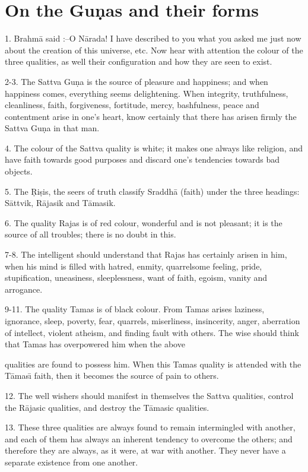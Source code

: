 \chapter{On the Gu\d{n}as and their forms}

1. Brahm\=a said :--O N\=arada! I have described to you what you asked me just now about the creation of this universe, etc. Now hear with attention the colour of the three qualities, as well their configuration and how they are seen to exist.

2-3. The Sattva Gu\d{n}a is the source of pleasure and happiness; and when happiness comes, everything seems delightening. When integrity, truthfulness, cleanliness, faith, forgiveness, fortitude, mercy, bashfulness, peace and contentment arise in one's heart, know certainly that there has arisen firmly the Sattva Gu\d{n}a in that man.

4. The colour of the Sattva quality is white; it makes one always like religion, and have faith towards good purposes and discard one's tendencies towards bad objects.

5. The \d{R}i\d{s}is, the seers of truth classify Sraddh\=a (faith) under the three headings: S\=attvik, R\=ajasik and T\=amasik.

6. The quality Rajas is of red colour, wonderful and is not pleasant; it is the source of all troubles; there is no doubt in this.

7-8. The intelligent should understand that Rajas has certainly arisen in him, when his mind is filled with hatred, enmity, quarrelsome feeling, pride, stupification, uneasiness, sleeplessness, want of faith, egoism, vanity and arrogance.

9-11. The quality Tamas is of black colour. From Tamas arises laziness, ignorance, sleep, poverty, fear, quarrels, miserliness, insincerity, anger, aberration of intellect, violent atheism, and finding fault with others. The wise should think that Tamas has overpowered him when the above

qualities are found to possess him. When this Tamas quality is attended with the T\=amas\={\i} faith, then it becomes the source of pain to others.

12. The well wishers should manifest in themselves the Sattva qualities, control the R\=ajasic qualities, and destroy the T\=amasic qualities.

13. These three qualities are always found to remain intermingled with another, and each of them has always an inherent tendency to overcome the others; and therefore they are always, as it were, at war with another. They never have a separate existence from one another.

